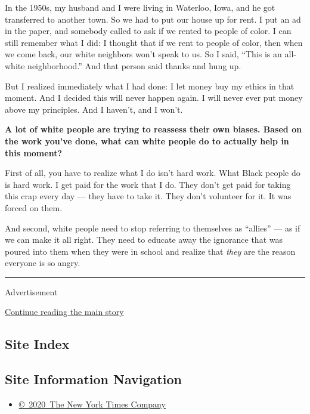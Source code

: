 In the 1950s, my husband and I were living in Waterloo, Iowa, and he got
transferred to another town. So we had to put our house up for rent. I
put an ad in the paper, and somebody called to ask if we rented to
people of color. I can still remember what I did: I thought that if we
rent to people of color, then when we come back, our white neighbors
won't speak to us. So I said, ``This is an all-white neighborhood.'' And
that person said thanks and hung up.

But I realized immediately what I had done: I let money buy my ethics in
that moment. And I decided this will never happen again. I will never
ever put money above my principles. And I haven't, and I won't.

\textbf{A lot of white people are trying to reassess their own biases.
Based on the work you've done, what can white people do to actually help
in this moment?}

First of all, you have to realize what I do isn't hard work. What Black
people do is hard work. I get paid for the work that I do. They don't
get paid for taking this crap every day --- they have to take it. They
don't volunteer for it. It was forced on them.

And second, white people need to stop referring to themselves as
``allies'' --- as if we can make it all right. They need to educate away
the ignorance that was poured into them when they were in school and
realize that \emph{they} are the reason everyone is so angry.

\begin{center}\rule{0.5\linewidth}{\linethickness}\end{center}

Advertisement

\protect\hyperlink{after-bottom}{Continue reading the main story}

\hypertarget{site-index}{%
\subsection{Site Index}\label{site-index}}

\hypertarget{site-information-navigation}{%
\subsection{Site Information
Navigation}\label{site-information-navigation}}

\begin{itemize}
\tightlist
\item
  \href{https://help.nytimes3xbfgragh.onion/hc/en-us/articles/115014792127-Copyright-notice}{©~2020~The
  New York Times Company}
\end{itemize}

